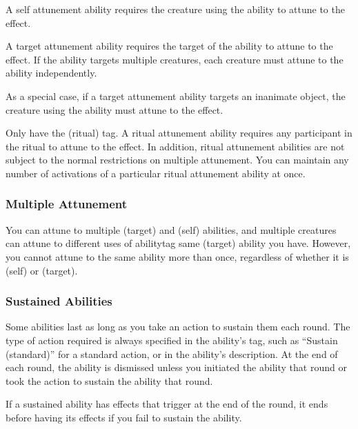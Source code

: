                  A self attunement ability requires the creature using the ability to attune to the effect.

                 A target attunement ability requires the target of the ability to attune to the effect.
                If the ability targets multiple creatures, each creature must attune to the ability independently.

                As a special case, if a target attunement ability targets an inanimate object, the creature using the ability must attune to the effect.

                 Only  have the  (ritual) tag.
                A ritual attunement ability requires any participant in the ritual to attune to the effect.
                In addition, ritual attunement abilities are not subject to the normal restrictions on multiple attunement.
                You can maintain any number of activations of a particular ritual attunement ability at once.

            \subsubsection{Multiple Attunement}
                You can attune to multiple  (target) and  (self) abilities, and multiple creatures can attune to different uses of abilitytag same  (target) ability you have.
                However, you cannot attune to the same ability more than once, regardless of whether it is  (self) or  (target).

        \subsubsection{Sustained Abilities}\label{Sustained Abilities}
            Some abilities last as long as you take an action to sustain them each round.
            The type of action required is always specified in the ability's tag, such as ``Sustain (standard)'' for a standard action, or in the ability's description.
            At the end of each round, the ability is dismissed unless you initiated the ability that round or took the action to sustain the ability that round.

            If a sustained ability has effects that trigger at the end of the round, it ends before having its effects if you fail to sustain the ability.

